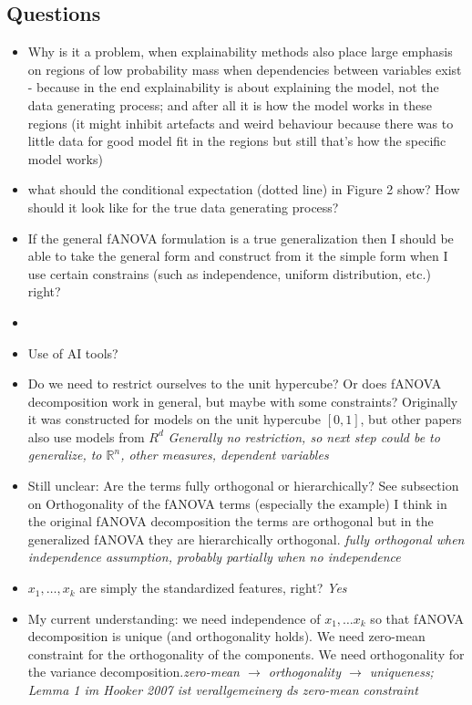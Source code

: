 \subsection*{Questions}


\begin{itemize}
    \item Why is it a problem, when explainability methods also place large emphasis on regions of low probability mass when dependencies between variables exist - because in the end explainability is about explaining the model, not the data generating process; and after all it is how the model works in these regions (it might inhibit artefacts and weird behaviour because there was to little data for good model fit in the regions but still that's how the specific model works) 
    \item \cite{hooker2007} what should the conditional expectation (dotted line) in Figure 2 show? How should it look like for the true data generating process?
    \item If the general fANOVA formulation is a true generalization then I should be able to take the general form and construct from it the simple form when I use certain constrains (such as independence, uniform distribution, etc.) right?
    \item 
    \item Use of AI tools?
    \item Do we need to restrict ourselves to the unit hypercube? Or does fANOVA decomposition work in general, but maybe with some constraints? Originally it was constructed for models on the unit hypercube $[0,1]$, but other papers also use models from $R^d$ \textit{Generally no restriction, so next step could be to generalize, to $\mathbb{R}^n$, other measures, dependent variables}
    \item Still unclear: Are the terms fully orthogonal or hierarchically? See subsection on Orthogonality of the fANOVA terms (especially the example) I think in the original fANOVA decomposition the terms are orthogonal but in the generalized fANOVA \citep{hooker2007} they are hierarchically orthogonal. \textit{fully orthogonal when independence assumption, probably partially when no independence}
    \item $x_1, \dots, x_k$ are simply the standardized features, right? \textit{Yes}
    \item {\color{orange}My current understanding: we need independence of $x_1, \dots x_k$ so that fANOVA decomposition is unique (and orthogonality holds). We need zero-mean constraint for the orthogonality of the components. We need orthogonality for the variance decomposition.}\textit{zero-mean $\rightarrow$ orthogonality $\rightarrow$ uniqueness; Lemma 1 im Hooker 2007 ist verallgemeinerg ds zero-mean constraint}

\end{itemize}
